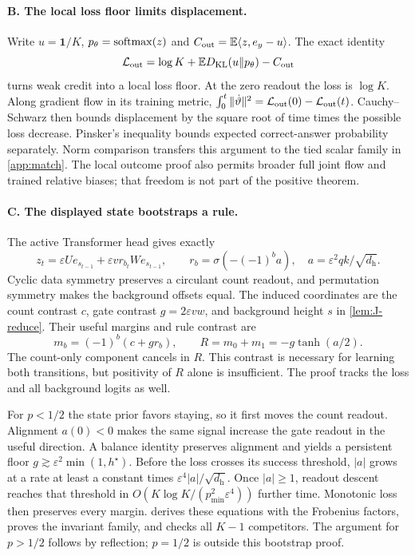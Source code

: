 \paragraph{B. The local loss floor limits displacement.}
Write $u=\mathbf1/K$, $p_\theta=\operatorname{softmax}(z)$ and $C_{\mathrm{out}}=\mathbb E\langle z,e_y-u\rangle$. The exact identity
\[
\mathcal L_{\mathrm{out}}=\log K+\mathbb ED_{\mathrm{KL}}(u\|p_\theta)-C_{\mathrm{out}}
\]
turns weak credit into a local loss floor. At the zero readout the loss is $\log K$. Along gradient flow in its training metric,
$\int_0^t\|\dot\vartheta\|^2=\mathcal L_{\mathrm{out}}(0)-\mathcal L_{\mathrm{out}}(t)$.
Cauchy--Schwarz then bounds displacement by the square root of time times the possible loss decrease. Pinsker's inequality bounds expected correct-answer probability separately. Norm comparison transfers this argument to the tied scalar family in \cref{app:match}. The local outcome proof also permits broader full joint flow and trained relative biases; that freedom is not part of the positive theorem.

\paragraph{C. The displayed state bootstraps a rule.}
The active Transformer head gives exactly
\begin{equation}\label{eq:actual-features}
z_t=\varepsilon Ue_{s_{t-1}}+\varepsilon v r_{b_t}We_{s_{t-1}},\qquad
r_b=\sigma(-(-1)^b a),\quad a=\varepsilon^2qk/\sqrt{d_{\mathrm h}}.
\end{equation}
Cyclic data symmetry preserves a circulant count readout, and permutation symmetry makes the background offsets equal. The induced coordinates are the count contrast $c$, gate contrast $g=2\varepsilon vw$, and background height $s$ in \cref{lem:J-reduce}. Their useful margins and rule contrast are
\begin{equation}\label{eq:rule}
m_b=(-1)^b(c+gr_b),\qquad R=m_0+m_1=-g\tanh(a/2).
\end{equation}
The count-only component cancels in $R$. This contrast is necessary for learning both transitions, but positivity of $R$ alone is insufficient. The proof tracks the loss and all background logits as well.

For $p<1/2$ the state prior favors staying, so it first moves the count readout. Alignment $a(0)<0$ makes the same signal increase the gate readout in the useful direction. A balance identity preserves alignment and yields a persistent floor $g\gtrsim\varepsilon^2\min(1,h^\star)$. Before the loss crosses its success threshold, $|a|$ grows at a rate at least a constant times $\varepsilon^4|a|/\sqrt{d_{\mathrm h}}$. Once $|a|\ge1$, readout descent reaches that threshold in $O(K\log K/(p_{\min}^2\varepsilon^4))$ further time. Monotonic loss then preserves every margin.  derives these equations with the Frobenius factors, proves the invariant family, and checks all $K-1$ competitors. The argument for $p>1/2$ follows by reflection; $p=1/2$ is outside this bootstrap proof.

